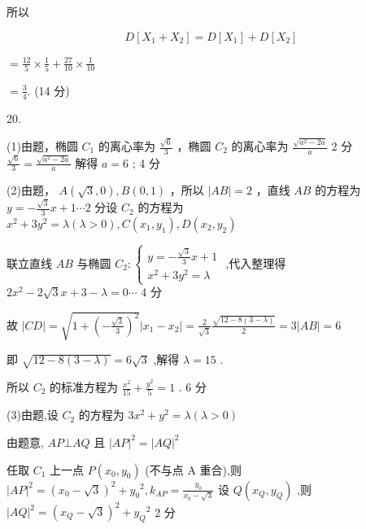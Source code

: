 \documentclass[10pt]{article}
\begin{document}
所以

\[
D\left\lbrack  {{X}_{1} + {X}_{2}}\right\rbrack   = D\left\lbrack  {X}_{1}\right\rbrack   + D\left\lbrack  {X}_{2}\right\rbrack
\]

\(= \frac{12}{5} \times  \frac{1}{5} + \frac{27}{10} \times  \frac{1}{10}\)

\(= \frac{3}{4}.\) (14 分)

20.

(1)由题，椭圆 \({C}_{1}\) 的离心率为 \(\frac{\sqrt{6}}{3}\) ，椭圆 \({C}_{2}\) 的离心率为 \(\frac{\sqrt{{a}^{2} - {2a}}}{a}\) 2 分 \(\frac{\sqrt{6}}{3} = \frac{\sqrt{{a}^{2} - {2a}}}{a}\) 解得 \(a = 6\) ; 4 分

(2)由题， \(A\left( {\sqrt{3},0}\right) ,B\left( {0,1}\right)\) ，所以 \(\left| {AB}\right|  = 2\) ，直线 \({AB}\) 的方程为 \(y =  - \frac{\sqrt{3}}{3}x + 1\cdots 2\) 分设 \({C}_{2}\) 的方程为 \({x}^{2} + 3{y}^{2} = \lambda \left( {\lambda  > 0}\right) ,C\left( {{x}_{1},{y}_{1}}\right) ,D\left( {{x}_{2},{y}_{2}}\right)\)

联立直线 \({AB}\) 与椭圆 \({C}_{2} : \left\{  \begin{array}{l} y =  - \frac{\sqrt{3}}{3}x + 1 \\  {x}^{2} + 3{y}^{2} = \lambda  \end{array}\right.\) ,代入整理得 \(2{x}^{2} - 2\sqrt{3}x + 3 - \lambda  = 0\cdots\) 4 分

故 \(\left| {CD}\right|  = \sqrt{1 + {\left( -\frac{\sqrt{3}}{3}\right) }^{2}}\left| {{x}_{1} - {x}_{2}}\right|  = \frac{2}{\sqrt{3}}\frac{\sqrt{{12} - 8\left( {3 - \lambda }\right) }}{2} = 3\left| {AB}\right|  = 6\)

即 \(\sqrt{{12} - 8\left( {3 - \lambda }\right) } = 6\sqrt{3}\) ,解得 \(\lambda  = {15}\) .

所以 \({C}_{2}\) 的标准方程为 \(\frac{{x}^{2}}{15} + \frac{{y}^{2}}{5} = 1\) . 6 分

(3)由题,设 \({C}_{2}\) 的方程为 \(3{x}^{2} + {y}^{2} = \lambda \left( {\lambda  > 0}\right)\)

由题意, \({AP} \bot  {AQ}\) 且 \({\left| AP\right| }^{2} = {\left| AQ\right| }^{2}\)

任取 \({C}_{1}\) 上一点 \(P\left( {{x}_{0},{y}_{0}}\right)\) (不与点 \(\mathrm{A}\) 重合),则 \({\left| AP\right| }^{2} = {\left( {x}_{0} - \sqrt{3}\right) }^{2} + {y}_{0}{}^{2},{k}_{AP} = \frac{{y}_{0}}{{x}_{0} - \sqrt{3}}\) 设 \(Q\left( {{x}_{Q},{y}_{Q}}\right)\) ,则 \({\left| AQ\right| }^{2} = {\left( {x}_{Q} - \sqrt{3}\right) }^{2} + {y}_{Q}{}^{2}\) 2 分
\end{document}
